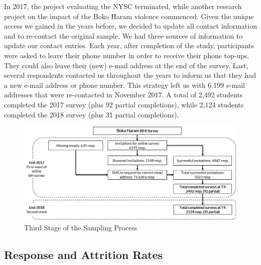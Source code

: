 In 2017, the project evaluating the NYSC terminated, while another research project on the impact of the Boko Haram violence commenced. Given the unique access we gained in the years before, we decided to update all contact information and to re-contact the original sample. We had three sources of information to update our contact entries. Each year, after completion of the study, participants were asked to leave their phone number in order to receive their phone top-ups. They could also leave their (new) e-mail address at the end of the survey. Last, several respondents contacted us throughout the years to inform us that they had a new e-mail address or phone number. This strategy left us with 6,199 e-mail addresses that were re-contacted in November 2017. A total of 2,492 students completed the 2017 survey (plus 92 partial completions), while 2,124 students completed the 2018 survey (plus 31 partial completions).

\vspace{3mm}
\begin{figure}[H]
\includegraphics[width=1\textwidth]{Appendices/Appendix_chapter_3/art2-app-figure3.png}
\caption{Third Stage of the Sampling Process}
\label{fig:art2-app-fig3}
\end{figure}


\subsection{Response and Attrition Rates}
